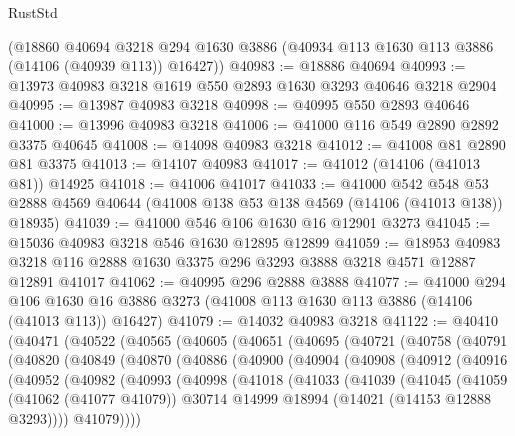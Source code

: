 \begin{lexlean}{RustStd}
\begin{coremodule}
    (@18860
      @40694
      @3218
      @294
      @1630
      @3886
      (@40934 @113 @1630 @113 @3886 (@14106 (@40939 @113)) @16427))
@40983 := @18886 @40694
@40993 := @13973 @40983 @3218 @1619 @550 @2893 @1630 @3293 @40646 @3218 @2904
@40995 := @13987 @40983 @3218
@40998 := @40995 @550 @2893 @40646
@41000 := @13996 @40983 @3218
@41006 := @41000 @116 @549 @2890 @2892 @3375 @40645
@41008 := @14098 @40983 @3218
@41012 := @41008 @81 @2890 @81 @3375
@41013 := @14107 @40983
@41017 := @41012 (@14106 (@41013 @81)) @14925
@41018 := @41006 @41017
@41033 := @41000
    @542
    @548
    @53
    @2888
    @4569
    @40644
    (@41008 @138 @53 @138 @4569 (@14106 (@41013 @138)) @18935)
@41039 := @41000 @546 @106 @1630 @16 @12901 @3273
@41045 := @15036 @40983 @3218 @546 @1630 @12895 @12899
@41059 := @18953
    @40983
    @3218
    @116
    @2888
    @1630
    @3375
    @296
    @3293
    @3888
    @3218
    @4571
    @12887
    @12891
    @41017
@41062 := @40995 @296 @2888 @3888
@41077 := @41000
    @294
    @106
    @1630
    @16
    @3886
    @3273
    (@41008 @113 @1630 @113 @3886 (@14106 (@41013 @113)) @16427)
@41079 := @14032 @40983 @3218
@41122 := @40410
    (@40471
      (@40522
        (@40565
          (@40605
            (@40651
              (@40695
                (@40721
                  (@40758
                    (@40791
                      (@40820
                        (@40849
                          (@40870
                            (@40886
                              (@40900
                                (@40904
                                  (@40908
                                    (@40912
                                      (@40916
                                        (@40952
                                          (@40982
                                            (@40993
                                              (@40998
                                                (@41018
                                                  (@41033
                                                    (@41039
                                                      (@41045
                                                        (@41059
                                                          (@41062 (@41077 @41079))
                                                          @30714
                                                          @14999
                                                          @18994
                                                          (@14021 (@14153 @12888 @3293))))
                                                      @41079))))

\end{coremodule}
\end{lexlean}

